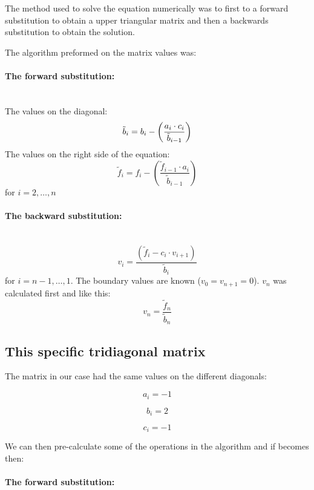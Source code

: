 The method used to solve the equation numerically was to first to a forward substitution to obtain a upper triangular matrix and then a backwards substitution to obtain the solution.

The algorithm preformed on the matrix values was:

\paragraph{The forward substitution:}

\hspace{1cm}\\
The values on the diagonal:
\[
\tilde{b}_i =  b_i - \left(\frac{a_i \cdot c_i}{\tilde{b}_{i-1}}\right)\linebreak
\]
The values on the right side of the equation:
\[
\tilde{f}_i =  f_i - \left(\frac{\tilde{f}_{i-1} \cdot a_i}{\tilde{b}_{i-1}}\right)
\]
for $i = 2, \dots, n $

\paragraph{The backward substitution:}

\hspace{1cm}\\
\[
v_i = \frac{\left(\tilde{f}_i - c_i\cdot v_{i+1}\right)}{\tilde{b}_i}
\]
for $i = n-1, \dots, 1 $. The boundary values are known ($v_0 = v_{n+1} = 0$). $v_{n}$ was calculated first and like this:
\[
v_{n} = \frac{\tilde{f}_{n}}{\tilde{b}_{n}}
\]

\subsection{This specific tridiagonal matrix}

The matrix in our case had the same values on the different diagonals:
\begin{multicols}{3}

\[
a_i = -1
\]

\[
b_i = 2
\]

\[
c_i = -1
\]

\end{multicols}

We can then pre-calculate some of the operations in the algorithm and if becomes then:

\paragraph{The forward substitution:}

